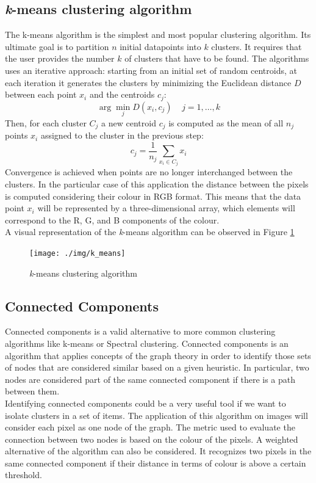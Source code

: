 \documentclass{usiinftr}
\begin{document}
\subsection{\textit{k}-means clustering algorithm} 
The k-means algorithm is the simplest and most popular clustering algorithm. Its ultimate goal is to partition $n$ initial datapoints into $k$ clusters. It requires that the user provides the number $k$ of clusters that have to be found. The algorithms uses an iterative approach: starting from an initial set of random centroids, at each iteration it generates the clusters by minimizing the Euclidean distance $D$ between each point $x_i$  and  the centroids $c_j$:  
$$\arg \min\limits_{j}D(x_i, c_j)\;\;\;\; j = 1, \dots, k$$
Then, for each cluster $C_j$ a new centroid $c_j$ is computed as the mean of all $n_j$ points $x_i$ assigned to the cluster in the previous step: 
$$c_j = \frac{1}{n_j} \sum_{x_i \in C_j} x_i$$
Convergence is achieved when points are no longer interchanged between the clusters.
In the particular case of this application the distance between the pixels is computed considering their colour in RGB format. This means that the data point $x_i$ will be represented by a three-dimensional array, which elements will correspond to the R, G, and B components of the colour. \\
A visual representation of the \textit{k}-means algorithm can be observed in Figure \ref{fig:1}
\begin{figure}[h]
	\centering
	\texttt{[image: ./img/k\_means]}
	\caption{\textit{k}-means clustering algorithm}
	\label{fig:1}
\end{figure}


\subsection{Connected Components}
Connected components is a valid alternative to more common clustering algorithms like k-means or Spectral clustering. 
Connected components is an algorithm that applies concepts of the graph theory in order to identify those sets of nodes that are considered similar based on a given heuristic. In particular, two nodes are considered part of the same connected component if there is a path between them. \\
Identifying connected components could be a very useful tool if we want to isolate clusters in a set of items. 
The application of this algorithm on images will consider each pixel as one node of the graph. The metric used to evaluate the connection between two nodes is based on the colour of the pixels. A weighted alternative of the algorithm can also be considered. It recognizes two pixels in the same connected component if their distance in terms of colour is above a certain threshold.
\end{document}
